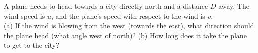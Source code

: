 A plane needs to head towards a city directly north and a distance
$D$ away. The wind speed is $u$, and the plane's speed with respect
to the wind is $v$.\\
%
(a) If the wind is blowing from the west (towards the east), what
direction should the plane head (what angle west of north)?\answercheck\hwendpart
%
(b) How long does it take the plane to get to the city?\answercheck
